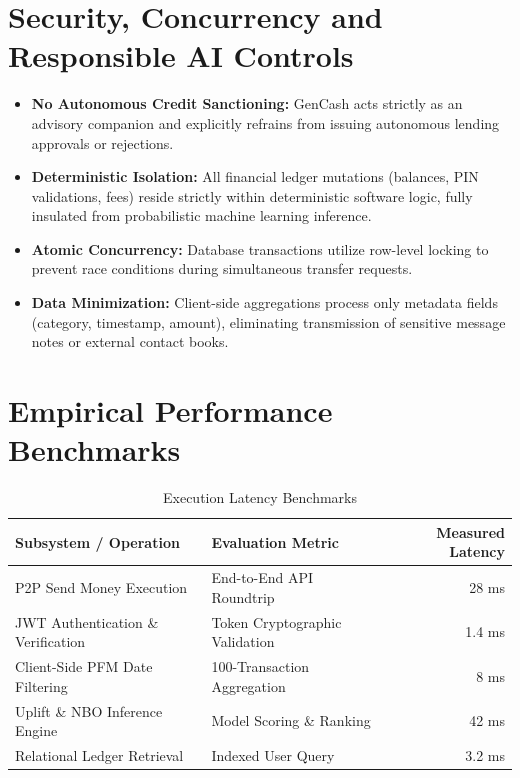 \documentclass[10.5pt,a4paper]{article}
\begin{document}
\section{Security, Concurrency and Responsible AI Controls}

\begin{itemize}[leftmargin=*]
    \item \textbf{No Autonomous Credit Sanctioning:} GenCash acts strictly as an advisory companion and explicitly refrains from issuing autonomous lending approvals or rejections.
    \item \textbf{Deterministic Isolation:} All financial ledger mutations (balances, PIN validations, fees) reside strictly within deterministic software logic, fully insulated from probabilistic machine learning inference.
    \item \textbf{Atomic Concurrency:} Database transactions utilize row-level locking to prevent race conditions during simultaneous transfer requests.
    \item \textbf{Data Minimization:} Client-side aggregations process only metadata fields (category, timestamp, amount), eliminating transmission of sensitive message notes or external contact books.
\end{itemize}

\section{Empirical Performance Benchmarks}

\begin{table}[htbp]
\centering
\small
\caption{Execution Latency Benchmarks}
\label{tab:perf}
\begin{tabular}{llr}
\toprule
\textbf{Subsystem / Operation} & \textbf{Evaluation Metric} & \textbf{Measured Latency} \\
\midrule
P2P Send Money Execution & End-to-End API Roundtrip & 28 ms \\
JWT Authentication \& Verification & Token Cryptographic Validation & 1.4 ms \\
Client-Side PFM Date Filtering & 100-Transaction Aggregation & 8 ms \\
Uplift \& NBO Inference Engine & Model Scoring \& Ranking & 42 ms \\
Relational Ledger Retrieval & Indexed User Query & 3.2 ms \\
\bottomrule
\end{tabular}
\end{table}
\end{document}
